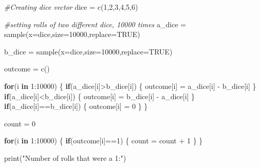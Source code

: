 \documentclass[
]{article}
\newenvironment{Shaded}{\begin{snugshade}}{\end{snugshade}}
\newcommand{\AttributeTok}[1]{\textcolor[rgb]{0.77,0.63,0.00}{#1}}
\newcommand{\CommentTok}[1]{\textcolor[rgb]{0.56,0.35,0.01}{\textit{#1}}}
\newcommand{\ConstantTok}[1]{\textcolor[rgb]{0.00,0.00,0.00}{#1}}
\newcommand{\ControlFlowTok}[1]{\textcolor[rgb]{0.13,0.29,0.53}{\textbf{#1}}}
\newcommand{\DecValTok}[1]{\textcolor[rgb]{0.00,0.00,0.81}{#1}}
\newcommand{\FunctionTok}[1]{\textcolor[rgb]{0.00,0.00,0.00}{#1}}
\newcommand{\NormalTok}[1]{#1}
\newcommand{\OtherTok}[1]{\textcolor[rgb]{0.56,0.35,0.01}{#1}}
\newcommand{\SpecialCharTok}[1]{\textcolor[rgb]{0.00,0.00,0.00}{#1}}
\newcommand{\StringTok}[1]{\textcolor[rgb]{0.31,0.60,0.02}{#1}}
\begin{document}
\begin{Shaded}
\begin{Highlighting}[]
\CommentTok{\#Creating dice vector}
\NormalTok{dice }\OtherTok{=} \FunctionTok{c}\NormalTok{(}\DecValTok{1}\NormalTok{,}\DecValTok{2}\NormalTok{,}\DecValTok{3}\NormalTok{,}\DecValTok{4}\NormalTok{,}\DecValTok{5}\NormalTok{,}\DecValTok{6}\NormalTok{)}

\CommentTok{\#setting rolls of two different dice, 10000 times}
\NormalTok{a\_dice }\OtherTok{=} \FunctionTok{sample}\NormalTok{(}\AttributeTok{x=}\NormalTok{dice,}\AttributeTok{size=}\DecValTok{10000}\NormalTok{,}\AttributeTok{replace=}\ConstantTok{TRUE}\NormalTok{)}

\NormalTok{b\_dice }\OtherTok{=} \FunctionTok{sample}\NormalTok{(}\AttributeTok{x=}\NormalTok{dice,}\AttributeTok{size=}\DecValTok{10000}\NormalTok{,}\AttributeTok{replace=}\ConstantTok{TRUE}\NormalTok{)}

\NormalTok{outcome }\OtherTok{=} \FunctionTok{c}\NormalTok{()}

\ControlFlowTok{for}\NormalTok{(i }\ControlFlowTok{in} \DecValTok{1}\SpecialCharTok{:}\DecValTok{10000}\NormalTok{)}
\NormalTok{\{}
  \ControlFlowTok{if}\NormalTok{(a\_dice[i]}\SpecialCharTok{\textgreater{}}\NormalTok{b\_dice[i])}
\NormalTok{  \{}
\NormalTok{    outcome[i] }\OtherTok{=}\NormalTok{ a\_dice[i] }\SpecialCharTok{{-}}\NormalTok{ b\_dice[i]}
\NormalTok{  \}}
    \ControlFlowTok{if}\NormalTok{(a\_dice[i]}\SpecialCharTok{\textless{}}\NormalTok{b\_dice[i])}
\NormalTok{  \{}
\NormalTok{    outcome[i] }\OtherTok{=}\NormalTok{ b\_dice[i] }\SpecialCharTok{{-}}\NormalTok{ a\_dice[i]}
\NormalTok{  \}}
  \ControlFlowTok{if}\NormalTok{(a\_dice[i]}\SpecialCharTok{==}\NormalTok{b\_dice[i])}
\NormalTok{  \{}
\NormalTok{    outcome[i] }\OtherTok{=} \DecValTok{0}
\NormalTok{  \}}
\NormalTok{\}}

\NormalTok{count }\OtherTok{=} \DecValTok{0}

\ControlFlowTok{for}\NormalTok{(i }\ControlFlowTok{in} \DecValTok{1}\SpecialCharTok{:}\DecValTok{10000}\NormalTok{)}
\NormalTok{\{}
  \ControlFlowTok{if}\NormalTok{(outcome[i]}\SpecialCharTok{==}\DecValTok{1}\NormalTok{)}
\NormalTok{  \{}
\NormalTok{    count }\OtherTok{=}\NormalTok{ count }\SpecialCharTok{+} \DecValTok{1}
\NormalTok{  \}}
\NormalTok{\}}

\FunctionTok{print}\NormalTok{(}\StringTok{"Number of rolls that were a 1:"}\NormalTok{)}
\end{Highlighting}
\end{Shaded}
\end{document}
